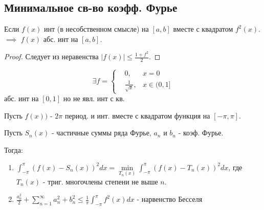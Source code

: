 \documentclass{article}
\begin{document}
\subsection{Минимальное св-во коэфф. Фурье}
\begin{lemma}
  Если $f(x)$ инт (в несобственном смысле) на $[a,b]$ вместе с квадратом $f^{2}(x)$.
  $\implies$ $f(x)$ абс. инт на $[a,b]$.
\end{lemma}
\begin{proof}
  Следует из неравенства $|f(x)|\le \frac{1+f^{2}}{2}$.
\end{proof}
\begin{remark}
  \[
    \exists f=\left\{\begin{aligned}
      &0, & x=0 \\ 
      &\frac{1}{\sqrt{x}}, & x\in (0, 1]
    \end{aligned}\right.
  \]
  абс. инт на $[0,1]$ но не явл. инт с кв.
\end{remark}
\begin{theorem}
  Пусть $f(x))$ - $2\pi$ период. и инт. вместе с квадратом функция на $[-\pi,\pi]$.

  Пусть $S_n(x)$ - частичные суммы ряда Фурье, $a_n$ и $b_n$ - коэф. Фурье.

  Тогда:
  \begin{enumerate}
    \item $\int_{-\pi}^{\pi}(f(x)-S_n(x))^{2}dx=\min\limits_{T_n(x)}\int_{-\pi}^{\pi}(f(x)-T_n(x))^{2}dx$,
      где $T_n(x)$ - триг. многочлены степени не выше $n$.
    \item $\frac{a_0^{2}}{2}+\sum_{n=1}^{\infty}a^{2}_n+b^{2}_{n}\le \frac{1}{\pi}\int_{-\pi}^{\pi}f^{2}(x)dx$
      - нарвенство Бесселя
  \end{enumerate}
\end{theorem}
\end{document}
